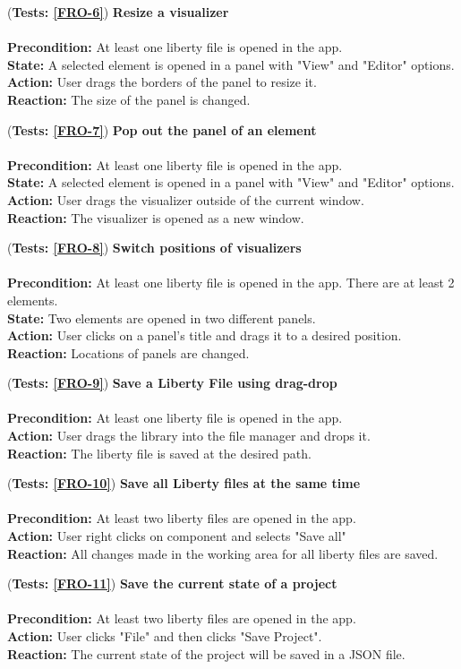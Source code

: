 \documentclass[10pt,a4paper]{report}
\newcommand{\precondition}[1]{
    \textbf{Precondition: } #1 \leavevmode \\
}
\newcommand{\action}[1]{
    \textbf{Action: } #1 \leavevmode \\
}
\newcommand{\state}[1]{
    \textbf{State: } #1 \leavevmode \\
}
\newcommand{\reaction}[1]{
    \textbf{Reaction: } #1 \leavevmode \\
}
\newcommand{\GTCODescription}[2]{
    (\textbf{Tests: #1}) \textbf{#2} \leavevmode \\
}
\begin{document}
\begin{GTCO}
    \item \GTCODescription{\ref{FRO-6}}
    {Resize a visualizer} \leavevmode \\ 
        \precondition{At least one liberty file is opened in the app.}
        \state{A selected element is opened in a panel with "View" and "Editor" options.}
        \action{User drags the borders of the panel to resize it.}
        \reaction{The size of the panel is changed.}\label{GTCO-6}
    
    \item \GTCODescription{\ref{FRO-7}}
    {Pop out the panel of an element} \leavevmode \\ 
        \precondition{At least one liberty file is opened in the app.}
        \state{A selected element is opened in a panel with "View" and "Editor" options.}
        \action{User drags the visualizer outside of the current window.}
        \reaction{The visualizer is opened as a new window.}\label{GTCO-7}
    
    \item \GTCODescription{\ref{FRO-8}}
    {Switch positions of visualizers} \leavevmode \\ 
        \precondition{At least one liberty file is opened in the app. There are at least 2 elements.}
        \state{Two elements are opened in two different panels.}
        \action{User clicks on a panel’s title and drags it to a desired position.}
        \reaction{Locations of panels are changed.}\label{GTCO-8}
    
    \item \GTCODescription{\ref{FRO-9}}
    {Save a Liberty File using drag-drop} \leavevmode \\ 
        \precondition{At least one liberty file is opened in the app.}
        \action{User drags the library into the file manager and drops it.}
        \reaction{The liberty file is saved at the desired path.}\label{GTCO-9}
    
    \item \GTCODescription{\ref{FRO-10}}
    {Save all Liberty files at the same time} \leavevmode \\ 
        \precondition{At least two liberty files are opened in the app.}
        \action{User right clicks on component and selects "Save all"}
        \reaction{All changes made in the working area for all liberty files are saved.}\label{GTCO-10}
    
    \item \GTCODescription{\ref{FRO-11}}
    {Save the current state of a project}\leavevmode \\ 
        \precondition{ At least two liberty files are opened in the app.}
        \action{User clicks "File" and then clicks "Save Project".}
        \reaction{The current state of the project will be saved in a JSON file.}\label{GTCO-11}
    

\end{GTCO}
\end{document}
